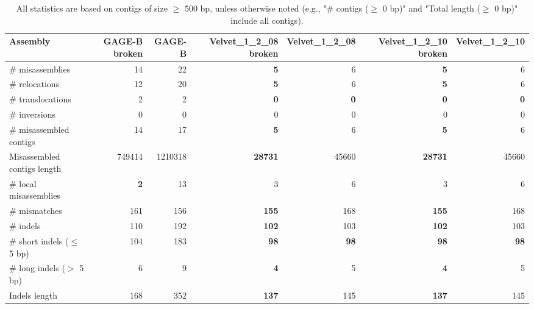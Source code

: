 \documentclass[12pt,a4paper]{article}
\begin{document}
\begin{table}[ht]
\begin{center}
\caption{All statistics are based on contigs of size $\geq$ 500 bp, unless otherwise noted (e.g., "\# contigs ($\geq$ 0 bp)" and "Total length ($\geq$ 0 bp)" include all contigs).}
\begin{tabular}{|l*{6}{|r}|}
\hline
Assembly & GAGE-B broken & GAGE-B & Velvet\_1\_2\_08 broken & Velvet\_1\_2\_08 & Velvet\_1\_2\_10 broken & Velvet\_1\_2\_10 \\ \hline
\# misassemblies & 14 & 22 & {\bf 5} & 6 & {\bf 5} & 6 \\ \hline
\hspace{5mm}\# relocations & 12 & 20 & {\bf 5} & 6 & {\bf 5} & 6 \\ \hline
\hspace{5mm}\# translocations & 2 & 2 & {\bf 0} & {\bf 0} & {\bf 0} & {\bf 0} \\ \hline
\hspace{5mm}\# inversions & 0 & 0 & 0 & 0 & 0 & 0 \\ \hline
\# misassembled contigs & 14 & 17 & {\bf 5} & 6 & {\bf 5} & 6 \\ \hline
Misassembled contigs length & 749414 & 1210318 & {\bf 28731} & 45660 & {\bf 28731} & 45660 \\ \hline
\# local misassemblies & {\bf 2} & 13 & 3 & 6 & 3 & 6 \\ \hline
\# mismatches & 161 & 156 & {\bf 155} & 168 & {\bf 155} & 168 \\ \hline
\# indels & 110 & 192 & {\bf 102} & 103 & {\bf 102} & 103 \\ \hline
\hspace{5mm}\# short indels ($\leq$ 5 bp) & 104 & 183 & {\bf 98} & {\bf 98} & {\bf 98} & {\bf 98} \\ \hline
\hspace{5mm}\# long indels ($>$ 5 bp) & 6 & 9 & {\bf 4} & 5 & {\bf 4} & 5 \\ \hline
Indels length & 168 & 352 & {\bf 137} & 145 & {\bf 137} & 145 \\ \hline
\end{tabular}
\end{center}
\end{table}
\end{document}

